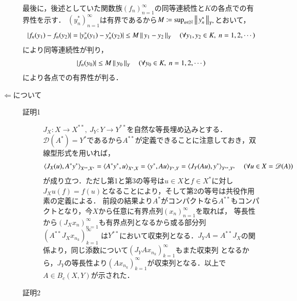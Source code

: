 \begin{prf}
\begin{description}
				最後に，後述としていた関数族$(f_n)_{n=1}^{\infty}$の同等連続性と$K$の各点での有界性を示す．
				$(y_n^*)_{n=1}^{\infty}$は有界であるから$M \coloneqq \operatorname*{sup}_{n\in\mathbb{N}} \left\|\, y_n^*\, \right\|_{Y^*}$とおいて，
				\begin{align}
					|f_n(y_1) - f_n(y_2)| = |y_n^*(y_1) - y_n^*(y_2)| \leq M\left\|\, y_1 - y_2\, \right\|_{Y} \quad (\forall y_1,y_2 \in K,\ n=1,2,\cdots)
				\end{align}
				により同等連続性が判り，
				\begin{align}
					|f_n(y_0)| \leq M \left\|\, y_0\, \right\|_{Y} \quad (\forall y_0 \in K,\ n=1,2,\cdots)
				\end{align}
				により各点での有界性が判る．
			
			\item[$\Leftarrow$について]\mbox{}
				\begin{description}
					\item[証明1]
						$J_X:X \longrightarrow X^{**},\ J_Y:Y \longrightarrow Y^{**}$を自然な等長埋め込みとする．
						$\mathscr{D}(A^*)=Y^*$であるから$A^{**}$が定義できることに注意しておき，双線型形式を用いれば，
						\begin{align}
							\inprod<J_X(u),A^*y^*>_{X^{**},X^*} = \inprod<A^*y^*,u>_{X^{*},X} = \inprod<y^*,Au>_{Y^{*},Y} = \inprod<J_Y(Au),y^*>_{Y^{**},Y^*} \quad (\forall u \in X=\mathscr{D}(A))
						\end{align}
						が成り立つ．ただし第1と第3の等号は$u \in X$と$f \in X^*$に対し$J_Xu(f)=f(u)$となることにより，そして第2の等号は共役作用素の定義による．
						前段の結果より$A^*$がコンパクトなら$A^{**}$もコンパクトとなり，今$X$から任意に有界点列$(x_n)_{n=1}^{\infty}$を取れば，
						等長性から$\left(J_Xx_n\right)_{n=1}^{\infty}$も有界点列となるから或る部分列$\left(A^{**}J_Xx_{n_k}\right)_{k=1}^{\infty}$
						は$Y^{**}$において収束列となる．$J_YA = A^{**}J_X$の関係より，同じ添数について$\left(J_YAx_{n_k}\right)_{k=1}^{\infty}$もまた収束列
						となるから，$J_Y$の等長性より$\left(Ax_{n_k}\right)_{k=1}^{\infty}$が収束列となる．以上で$A \in B_c(X,Y)$が示された．
					\item[証明2]
						
				\end{description}
		\end{description}
	\end{prf}